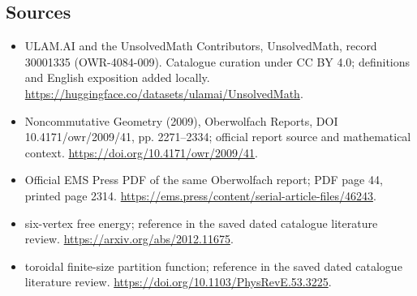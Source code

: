 \documentclass[11pt]{article}
\begin{document}
\subsection{Sources}
\begin{itemize}
\item[\hypertarget{source:30001335:1}{S1}] ULAM.AI and the UnsolvedMath Contributors, UnsolvedMath, record 30001335 (OWR-4084-009). Catalogue curation under CC BY 4.0; definitions and English exposition added locally.
\url{https://huggingface.co/datasets/ulamai/UnsolvedMath}.
\item[\hypertarget{source:30001335:2}{S2}] Noncommutative Geometry (2009), Oberwolfach Reports, DOI 10.4171/owr/2009/41, pp. 2271--2334; official report source and mathematical context.
\url{https://doi.org/10.4171/owr/2009/41}.
\item[\hypertarget{source:30001335:3}{S3}] Official EMS Press PDF of the same Oberwolfach report; PDF page 44, printed page 2314.
\url{https://ems.press/content/serial-article-files/46243}.
\item[\hypertarget{source:30001335:4}{S4}] six-vertex free energy; reference in the saved dated catalogue literature review.
\url{https://arxiv.org/abs/2012.11675}.
\item[\hypertarget{source:30001335:5}{S5}] toroidal finite-size partition function; reference in the saved dated catalogue literature review.
\url{https://doi.org/10.1103/PhysRevE.53.3225}.
\end{itemize}
\label{end:30001335}
\end{document}
